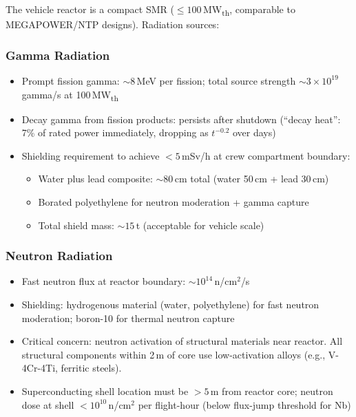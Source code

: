 \documentclass[11pt,a4paper]{article}
\begin{document}
The vehicle reactor is a compact SMR ($\leq 100$\,MW\textsubscript{th},
comparable to MEGAPOWER/NTP designs). Radiation sources:

\subsubsection{Gamma Radiation}

\begin{itemize}
  \item Prompt fission gamma: $\sim 8$\,MeV per fission; total source
    strength $\sim 3 \times 10^{19}$\,gamma/s at 100\,MW\textsubscript{th}
  \item Decay gamma from fission products: persists after shutdown
    (``decay heat'': 7\% of rated power immediately, dropping as
    $t^{-0.2}$ over days)
  \item Shielding requirement to achieve $< 5$\,mSv/h at crew compartment
    boundary:
    \begin{itemize}
      \item Water plus lead composite: $\sim 80$\,cm total (water 50\,cm
        + lead 30\,cm)
      \item Borated polyethylene for neutron moderation + gamma capture
      \item Total shield mass: $\sim 15$\,t (acceptable for vehicle scale)
    \end{itemize}
\end{itemize}

\subsubsection{Neutron Radiation}

\begin{itemize}
  \item Fast neutron flux at reactor boundary: $\sim 10^{14}$\,n/cm$^2$/s
  \item Shielding: hydrogenous material (water, polyethylene) for fast
    neutron moderation; boron-10 for thermal neutron capture
  \item Critical concern: neutron activation of structural materials
    near reactor. All structural components within 2\,m of core use
    low-activation alloys (e.g., V-4Cr-4Ti, ferritic steels).
  \item Superconducting shell location must be $> 5$\,m from reactor core;
    neutron dose at shell $< 10^{10}$\,n/cm$^2$ per flight-hour
    (below flux-jump threshold for Nb)
\end{itemize}
\end{document}
